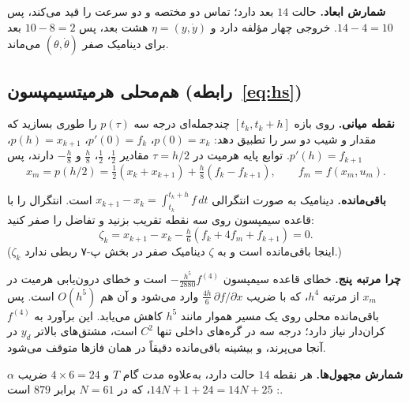 \documentclass[10pt,twocolumn]{article}
\newcommand{\en}[1]{\lr{#1}}
\newcommand{\nd}{\lr{\textendash}}
\begin{document}
\textbf{شمارش ابعاد.} حالت $14$ بعد دارد؛ تماس دو مختصه و دو سرعت را قید می‌کند، پس
$14-4=10$. خروجی چهار مؤلفه دارد و $\eta=(y,\dot y)$ هشت بعد، پس $10-8=2$ بعد برای دینامیک صفر
$(\theta,\dot\theta)$ می‌ماند.

\subsection{هم‌محلی هرمیت\nd{}سیمپسون (رابطه~\eqref{eq:hs})}
\textbf{نقطه میانی.} روی بازه $[t_k,t_k+h]$ چندجمله‌ای درجه سه $p(\tau)$ را طوری بسازید که
مقدار و شیب دو سر را تطبیق دهد: $p(0)=x_k$، $p'(0)=f_k$، $p(h)=x_{k+1}$، $p'(h)=f_{k+1}$.
توابع پایه هرمیت در $\tau=h/2$ مقادیر $\tfrac12$، $\tfrac12$، $\tfrac{h}{8}$ و $-\tfrac{h}{8}$ دارند، پس
\begin{equation*}
    x_m=p(h/2)=\tfrac12(x_k+x_{k+1})+\tfrac{h}{8}(f_k-f_{k+1}),\qquad f_m=f(x_m,u_m).
\end{equation*}

\textbf{باقی‌مانده.} دینامیک به صورت انتگرالی
$x_{k+1}-x_k=\int_{t_k}^{t_k+h}f\,dt$ است. انتگرال را با قاعده سیمپسون روی سه نقطه تقریب بزنید
و تفاضل را صفر کنید:
\begin{equation*}
    \zeta_k=x_{k+1}-x_k-\tfrac{h}{6}(f_k+4f_m+f_{k+1})=0 .
\end{equation*}
($\zeta_k$ اینجا باقی‌مانده است و به $\zeta$ دینامیک صفر در بخش پ-۷ ربطی ندارد.)

\textbf{چرا مرتبه پنج.} خطای قاعده سیمپسون $-\tfrac{h^5}{2880}f^{(4)}$ است و خطای درون‌یابی
هرمیت در $x_m$ از مرتبه $h^4$، که با ضریب $\tfrac{4h}{6}\,\partial f/\partial x$ وارد می‌شود و آن
هم $O(h^5)$ است. پس باقی‌مانده محلی روی یک مسیر هموار مانند $h^5$ کاهش می‌یابد. این برآورد به
$f^{(4)}$ کران‌دار نیاز دارد؛ \en{B-spline} درجه سه در گره‌های داخلی تنها $C^2$ است، مشتق‌های
بالاتر $y_d$ در آنجا می‌پرند، و بیشینه باقی‌مانده دقیقاً در همان فازها متوقف می‌شود.

\textbf{شمارش مجهول‌ها.} هر نقطه $14$ حالت دارد، به‌علاوه مدت گام $T$ و $4\times6=24$ ضریب
$\alpha$: $14N+1+24=14N+25$، که در $N=61$ برابر $879$ است.

\end{document}
